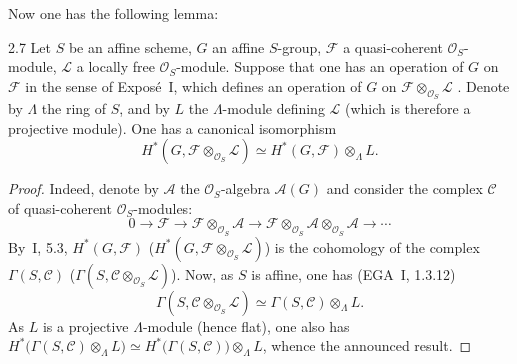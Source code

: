 Now one has the following lemma:

\begin{lemma}{2.7}\label{III.2.7}
Let \(S\) be an affine scheme, \(G\) an affine \(S\)-group, \(\mathcal{F}\) a
quasi-coherent \(\mathcal{O}_{S}\)-module, \(\mathcal{L}\) a locally free
\(\mathcal{O}_{S}\)-module. Suppose that one has an operation of \(G\) on
\(\mathcal{F}\) in the sense of Exposé~I, which defines an operation of \(G\)
on \(\mathcal{F}\otimes_{\mathcal{O}_{S}}\mathcal{L}\)%
{\renewcommand{\thefootnote}{(60)}}.
Denote by \(\Lambda\) the ring of \(S\), and by \(L\) the \(\Lambda\)-module
defining \(\mathcal{L}\) (which is therefore a projective module). One has a
canonical isomorphism
\[
H^{*}(G,\mathcal{F}\otimes_{\mathcal{O}_{S}}\mathcal{L})
  \simeq
  H^{*}(G,\mathcal{F})\otimes_{\Lambda}L.
\]
\end{lemma}

\begin{proof}
\renewcommand{\qedsymbol}{}
{\renewcommand{\thefootnote}{(61)}}
Indeed, denote by \(\mathcal{A}\) the \(\mathcal{O}_{S}\)-algebra
\(\mathcal{A}(G)\) and consider the complex \(\mathcal{C}\) of quasi-coherent
\(\mathcal{O}_{S}\)-modules:
\[
0\longrightarrow\mathcal{F}
  \longrightarrow\mathcal{F}\otimes_{\mathcal{O}_{S}}\mathcal{A}
  \longrightarrow\mathcal{F}\otimes_{\mathcal{O}_{S}}\mathcal{A}
    \otimes_{\mathcal{O}_{S}}\mathcal{A}
  \longrightarrow\cdots
\]
By~I, 5.3, \(H^{*}(G,\mathcal{F})\)
(\resp \(H^{*}(G,\mathcal{F}\otimes_{\mathcal{O}_{S}}\mathcal{L})\))
is the cohomology of the complex \(\Gamma(S,\mathcal{C})\)
(\resp \(\Gamma(S,\mathcal{C}\otimes_{\mathcal{O}_{S}}\mathcal{L})\)).
Now, as \(S\) is affine, one has (\cf EGA~I, 1.3.12)
\[
\Gamma(S,\mathcal{C}\otimes_{\mathcal{O}_{S}}\mathcal{L})
  \simeq
  \Gamma(S,\mathcal{C})\otimes_{\Lambda}L.
\]
As \(L\) is a projective \(\Lambda\)-module (hence flat), one also has
\(H^{*}\bigl(\Gamma(S,\mathcal{C})\otimes_{\Lambda}L\bigr)
\simeq H^{*}\bigl(\Gamma(S,\mathcal{C})\bigr)\otimes_{\Lambda}L\),
whence the announced result.
\end{proof}

